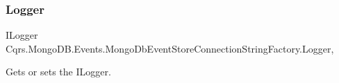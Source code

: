 \subsubsection{\texorpdfstring{Logger}{Logger}}
{\footnotesize\ttfamily I\+Logger Cqrs.\+Mongo\+D\+B.\+Events.\+Mongo\+Db\+Event\+Store\+Connection\+String\+Factory.\+Logger\hspace{0.3cm}{\ttfamily [get]}, {\ttfamily [protected]}}



Gets or sets the I\+Logger. 

